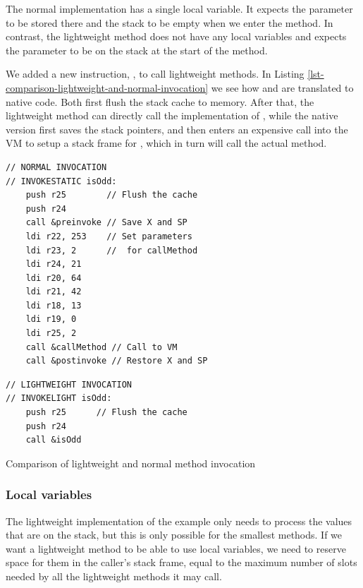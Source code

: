 The normal implementation has a single local variable. It expects the parameter to be stored there and the stack to be empty when we enter the method. In contrast, the lightweight method does not have any local variables and expects the parameter to be on the stack at the start of the method.

We added a new instruction, , to call lightweight methods. In Listing \ref{lst-comparison-lightweight-and-normal-invocation} we see how  and  are translated to native code. Both first flush the stack cache to memory. After that, the lightweight method can directly call the implementation of , while the native version first saves the stack pointers, and then enters an expensive call into the VM to setup a stack frame for , which in turn will call the actual method.

\begin{listing}
\centering
\begin{minipage}[t]{0.5\textwidth}
\centering
\begin{verbatim}
// NORMAL INVOCATION
// INVOKESTATIC isOdd:
    push r25        // Flush the cache
    push r24
    call &preinvoke // Save X and SP
    ldi r22, 253    // Set parameters
    ldi r23, 2      //  for callMethod
    ldi r24, 21
    ldi r20, 64
    ldi r21, 42
    ldi r18, 13
    ldi r19, 0
    ldi r25, 2
    call &callMethod // Call to VM
    call &postinvoke // Restore X and SP
\end{verbatim}
\end{minipage}\hfill
\begin{minipage}[t]{0.45\textwidth}
\centering
\begin{verbatim}
// LIGHTWEIGHT INVOCATION
// INVOKELIGHT isOdd:
    push r25      // Flush the cache
    push r24
    call &isOdd
\end{verbatim}
\end{minipage}
\caption{Comparison of lightweight and normal method invocation}
\label{lst-comparison-lightweight-and-normal-invocation}
\end{listing}

\subsubsection{Local variables}
The lightweight implementation of the  example only needs to process the values that are on the stack, but this is only possible for the smallest methods. If we want a lightweight method to be able to use local variables, we need to reserve space for them in the caller's stack frame, equal to the maximum number of slots needed by all the lightweight methods it may call.

